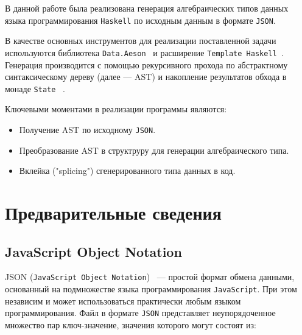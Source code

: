 


\graphicspath{ {img/} }




\Intro
В данной работе была реализована генерация алгебраических типов данных языка программирования \lstinline{Haskell} 
по исходным данным в формате \lstinline{JSON}.

В качестве основных инструментов для реализации поставленной задачи используются 
библиотека \lstinline{Data.Aeson}~\cite{aeson} и расширение \lstinline{Template Haskell}~\cite{tempHaskell}. Генерация 
производится с помощью рекурсивного прохода по абстрактному синтаксическому дереву (далее --- AST) и 
накопление результатов обхода в монаде \lstinline{State} ~\cite{stateM}.

Ключевыми моментами в реализации программы являются:

\begin{itemize}
  \item Получение AST по исходному \lstinline{JSON}.
  \item Преобразование AST в структруру для генерации алгебраического типа.
  \item Вклейка ("splicing") сгенерированного типа данных в код.
\end{itemize}

\chapter{Предварительные сведения}

\section{JavaScript Object Notation}

JSON (\lstinline{JavaScript Object Notation})~\cite{jsonStandart} --- простой формат обмена данными, основанный на подмножестве языка программирования \lstinline{JavaScript}. При этом независим и может использоваться практически любым языком программирования. Файл в формате \lstinline{JSON} представляет неупорядоченное множество пар ключ-значение, значения которого могут состоят из:  

